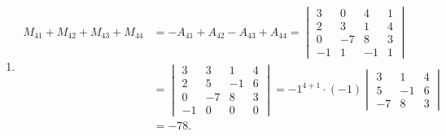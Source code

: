 \begin{exercise}
\begin{exgroup}
\begin{answer}
\begin{enumerate}
                \item \begin{align*}
                            M_{41}+M_{42}+M_{43}+M_{44}
                            & = -A_{41}+A_{42}-A_{43}+A_{44}
                            = \begin{vmatrix}
                                3  & 0  & 4  & 1 \\
                                2  & 3  & 1  & 4 \\
                                0  & -7 & 8  & 3 \\
                                -1 & 1  & -1 & 1
                            \end{vmatrix}                     \\
                            & = \begin{vmatrix}
                                    3  & 3  & 1  & 4 \\
                                    2  & 5  & -1 & 6 \\
                                    0  & -7 & 8  & 3 \\
                                    -1 & 0  & 0  & 0
                                \end{vmatrix}
                            = {-1}^{4+1} \cdot (-1) \begin{vmatrix}
                                                        3  & 1  & 4 \\
                                                        5  & -1 & 6 \\
                                                        -7 & 8  & 3
                                                    \end{vmatrix} \\
                            & = -78.
                        \end{align*}
            \end{enumerate}
        \end{answer}


\end{exgroup}
\end{exercise}
